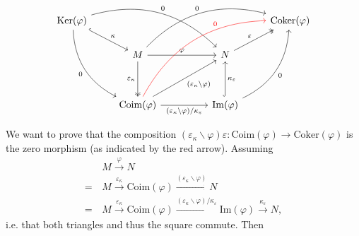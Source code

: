 \[
\begin{tikzcd}
\mathrm{Ker}(\varphi) \arrow[rd, "\kappa", hook] \arrow[rddd, "0"', bend right] \arrow[rrrd, "0", bend left] &                                                                                                                                                                                             &  &                                                                                               & \mathrm{Coker}(\varphi) \\
                                                                                                             & M \arrow[rrru, "0", bend left] \arrow[rr, "\varphi"] \arrow[dd, "\varepsilon_{\kappa}"', two heads]                                                                                         &  & N \arrow[ru, "\varepsilon", two heads]                                                        &                         \\
                                                                                                             &                                                                                                                                                                                             &  &                                                                                               &                         \\
                                                                                                             & \mathrm{Coim}(\varphi) \arrow[rruu, "(\varepsilon_{\kappa}\backslash \varphi)"'] \arrow[rr, "(\varepsilon_{\kappa}\backslash\varphi)/\kappa_{\varepsilon}"'] \arrow[rrruuu, "0", pos=.7, color=red, bend left] &  & \mathrm{Im}(\varphi) \arrow[uu, "\kappa_{\varepsilon}"', hook] \arrow[ruuu, "0"', bend right] &                        
\end{tikzcd}
\]

We want to prove that the composition
$(\varepsilon_{\kappa}\backslash\varphi) \varepsilon : \mathrm{Coim}(\varphi) \rightarrow \mathrm{Coker}(\varphi)$ is the zero morphism (as
indicated by the red arrow).
Assuming
\begin{align*}
&M \xrightarrow{\varphi} N \\
=\, &M \xrightarrow{\varepsilon_{\kappa}} \mathrm{Coim}(\varphi) \xrightarrow{(\varepsilon_{\kappa}\backslash\varphi)} N \\
=\, &M \xrightarrow{\varepsilon_{\kappa}} \mathrm{Coim}(\varphi) \xrightarrow{(\varepsilon_{\kappa}\backslash\varphi)/\kappa_{\varepsilon}}
\mathrm{Im}(\varphi) \xrightarrow{\kappa_{\varepsilon}} N,
\end{align*}
i.e. that both triangles and thus the square commute.
Then 

